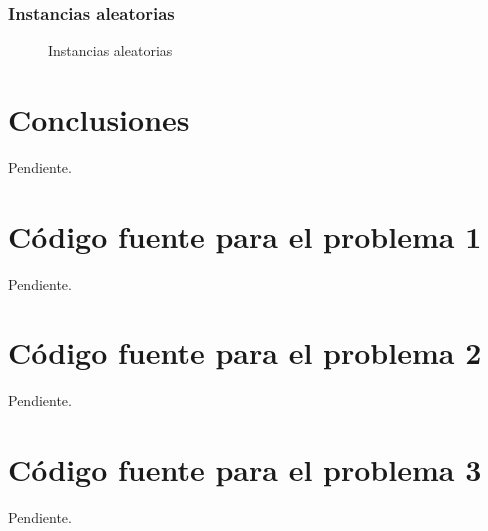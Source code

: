 \documentclass[a4paper, 10pt, twoside]{article}
\begin{document}
\subsubsection{Instancias aleatorias}

\begin{figure}[H]
  \centering
  
  \caption{Instancias aleatorias}
\end{figure}




\newpage

\section{Conclusiones}

Pendiente.




\newpage

\begin{appendices}

\section{Código fuente para el problema 1}

Pendiente.




\newpage

\section{Código fuente para el problema 2}

Pendiente.




\newpage

\section{Código fuente para el problema 3}

Pendiente.


\end{appendices}
\end{document}
